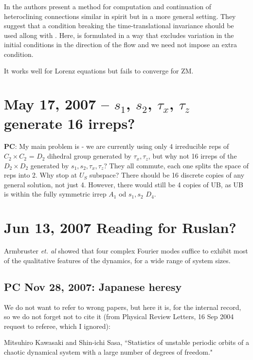\documentclass[letter,10pt]{article}
\begin{document}
In  the authors present a method for computation and continuation
of heteroclining connections similar in spirit but in a more general setting. They suggest that a condition breaking the time-translational invariance should be used allong with . Here,
 is formulated in a way that excludes variation in the initial conditions in the direction
of the flow and we need not impose an extra condition.

It works well for Lorenz equations but fails to converge for ZM.

\section{May 17, 2007 -- $s_1$, $s_2$, $\tau_x$, $\tau_z$ generate 16 irreps?}

{\bf PC}: My main problem is - we are currently using only 4 irreducible reps
of $C_2 \times C_2$ = $D_2$ dihedral group generated by $\tau_x, \tau_z$,
but why not 16 irreps of
the $D_2 \times D_2$ generated by $s_1, s_2, \tau_x, \tau_z$?
They all commute, each one splits the space of reps into 2.
Why stop at $U_S$ subspace?
There should be 16 discrete copies of any
general solution, not just 4.
However, there would still be 4 copies of UB, as UB is within the
fully symmetric irrep $A_1$ od $s_1, s_2$ $D_4$.

\section{Jun 13, 2007 Reading for Ruslan?}

Armbruster {\em et. al} showed that four complex Fourier
modes suffice to exhibit most
of the qualitative features of the dynamics,
for a wide range of system sizes.

\subsection{PC Nov 28, 2007: Japanese heresy}

We do not want to refer to wrong papers, but here it is, for
the internal record, so we do not forget not to cite it
(from Physical Review Letters, 16 Sep 2004 request to referee,
which I ignored):

Mitsuhiro Kawasaki and Shin-ichi Sasa,
    ``Statistics of unstable periodic orbits of a chaotic dynamical system
    with a large number of degrees of freedom."
\end{document}
